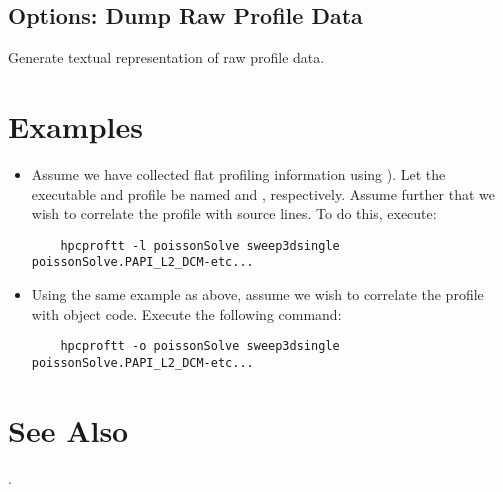 \documentclass[english]{article}
\begin{document}
\subsection{Options: Dump Raw Profile Data}

\begin{Description}
\item[\Opt{--dump}] Generate textual representation of raw profile data.
\end{Description}


\section{Examples}

\begin{itemize}

\item Assume we have collected flat profiling information using  ).
Let the executable and profile be named  and , respectively.
Assume further that we wish to correlate the profile with source lines.
To do this, execute:
\begin{verbatim}
    hpcproftt -l poissonSolve sweep3dsingle poissonSolve.PAPI_L2_DCM-etc...
\end{verbatim}

\item Using the same example as above, assume we wish to correlate the profile with object code.  Execute the following command:
\begin{verbatim}
    hpcproftt -o poissonSolve sweep3dsingle poissonSolve.PAPI_L2_DCM-etc...
\end{verbatim}

\end{itemize}


\section{See Also}

.
\end{document}
